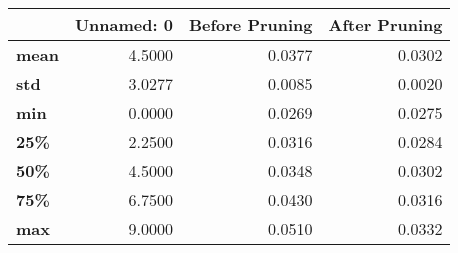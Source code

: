 \begin{tabular}{lrrr}
\toprule
{} &  Unnamed: 0 &  Before Pruning &  After Pruning \\
\midrule
\textbf{mean} &      4.5000 &          0.0377 &         0.0302 \\
\textbf{std } &      3.0277 &          0.0085 &         0.0020 \\
\textbf{min } &      0.0000 &          0.0269 &         0.0275 \\
\textbf{25\% } &      2.2500 &          0.0316 &         0.0284 \\
\textbf{50\% } &      4.5000 &          0.0348 &         0.0302 \\
\textbf{75\% } &      6.7500 &          0.0430 &         0.0316 \\
\textbf{max } &      9.0000 &          0.0510 &         0.0332 \\
\bottomrule
\end{tabular}
